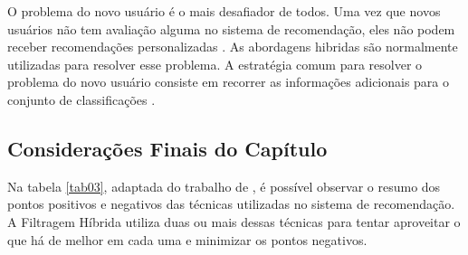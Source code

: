 O problema do novo usuário é o mais desafiador de todos. Uma vez que novos usuários não tem 
avaliação alguma no sistema de recomendação, eles não podem receber recomendações personalizadas \cite{burke2002}. As abordagens hibridas são normalmente utilizadas para resolver esse problema. 
A estratégia comum para resolver o problema do novo usuário consiste em recorrer as informações adicionais para o conjunto de classificações \cite{bobadilla2013}.

\subsection{Considerações Finais do Capítulo}

Na tabela \ref{tab03}, adaptada do trabalho de , é possível observar o resumo dos pontos positivos e negativos das técnicas utilizadas no sistema de recomendação.
A Filtragem Híbrida utiliza duas ou mais dessas técnicas para tentar aproveitar o que há de melhor em cada uma e minimizar os pontos negativos.

